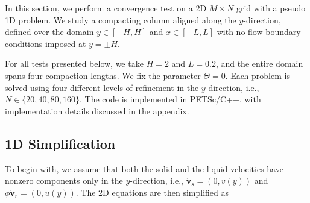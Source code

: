 In this section, we perform a convergence test on a 2D $M\times N$ grid 
with a pseudo 1D problem.
We study a compacting column aligned along the $y$-direction, 
defined over the domain $y \in [-H,H]$ and $x \in [-L,L]$
with no flow boundary conditions imposed at $y=\pm H$. 

For all tests presented below, we take $H=2$ and $L=0.2$, and the entire domain spans four
compaction lengths. We fix the parameter $\Theta = 0$. Each problem is solved
using four different levels of refinement in the $y$-direction, i.e., $N \in \{20,40,80,160\}$. The code is implemented
in PETSc/C++, with implementation details discussed in the appendix.

\subsection{1D Simplification}

To begin with, we assume that both the solid and the liquid velocities have nonzero 
components only in the $y$-direction, i.e.,
$\check{\mathbf{v}}_s = (0,v(y))$ and
$\phi\check{\mathbf{v}}_r = (0,u(y))$. 
The 2D equations are then simplified as


